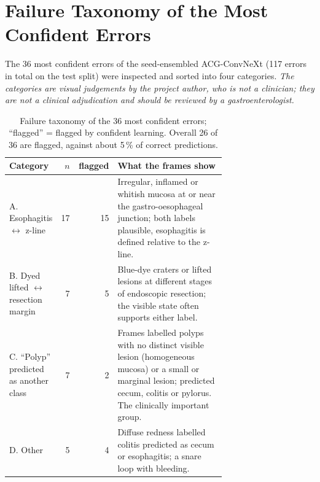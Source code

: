 \chapter{Failure Taxonomy of the Most Confident Errors}
The 36 most confident errors of the seed-ensembled ACG-ConvNeXt (117 errors in total on the test split) were inspected and sorted into four categories.
\emph{The categories are visual judgements by the project author, who is not a clinician; they are not a clinical adjudication and should be reviewed by a gastroenterologist.}
\begin{table}[h]
\centering\small
\begin{tabular}{p{0.2\linewidth}rrp{0.5\linewidth}}
\toprule
Category & $n$ & flagged & What the frames show \\
\midrule
A. Esophagitis $\leftrightarrow$ z-line & 17 & 15 & Irregular, inflamed or whitish mucosa at or near the gastro-oesophageal junction; both labels plausible, esophagitis is defined relative to the z-line. \\
B. Dyed lifted $\leftrightarrow$ resection margin & 7 & 5 & Blue-dye craters or lifted lesions at different stages of endoscopic resection; the visible state often supports either label. \\
C. ``Polyp'' predicted as another class & 7 & 2 & Frames labelled polyps with no distinct visible lesion (homogeneous mucosa) or a small or marginal lesion; predicted cecum, colitis or pylorus. The clinically important group. \\
D. Other & 5 & 4 & Diffuse redness labelled colitis predicted as cecum or esophagitis; a snare loop with bleeding. \\
\bottomrule
\end{tabular}
\caption{Failure taxonomy of the 36 most confident errors; ``flagged'' = flagged by confident learning. Overall 26 of 36 are flagged, against about 5\,\% of correct predictions.}
\end{table}
